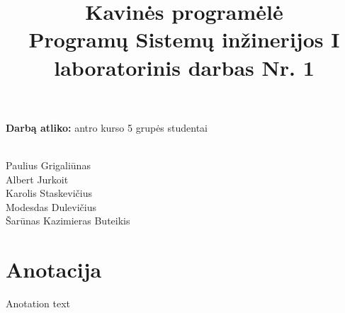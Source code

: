 \documentclass[12pt]{article}
\begin{document}

\title{\huge
{Kavinės programėlė}\\
{\large Programų Sistemų inžinerijos I laboratorinis darbas Nr. 1}}
\maketitle

\large
\begin{flushright}
\textbf{Darbą atliko:} antro kurso 5 grupės studentai\\\

Paulius Grigaliūnas\\
Albert Jurkoit\\
Karolis Staskevičius\\
Modesdas Dulevičius\\
Šarūnas Kazimieras Buteikis
\end{flushright}

\pagebreak

\section* {Anotacija}
Anotation text
\end{document}
